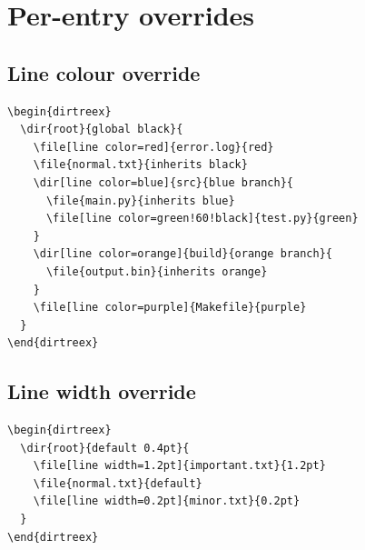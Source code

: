 \documentclass[11pt]{article}
\begin{document}
\begin{dirtreex}[
  line color=red!70!black, line width=1pt,
  box={true, border color=red!80!black,
       border width=2pt, background color=red!5,
       margin=6pt}]
\end{dirtreex}

\clearpage

\section{Per-entry overrides}

\subsection{Line colour override}

\begin{Verbatim}
\begin{dirtreex}
  \dir{root}{global black}{
    \file[line color=red]{error.log}{red}
    \file{normal.txt}{inherits black}
    \dir[line color=blue]{src}{blue branch}{
      \file{main.py}{inherits blue}
      \file[line color=green!60!black]{test.py}{green}
    }
    \dir[line color=orange]{build}{orange branch}{
      \file{output.bin}{inherits orange}
    }
    \file[line color=purple]{Makefile}{purple}
  }
\end{dirtreex}
\end{Verbatim}

\begin{dirtreex}
\end{dirtreex}

\subsection{Line width override}

\begin{Verbatim}
\begin{dirtreex}
  \dir{root}{default 0.4pt}{
    \file[line width=1.2pt]{important.txt}{1.2pt}
    \file{normal.txt}{default}
    \file[line width=0.2pt]{minor.txt}{0.2pt}
  }
\end{dirtreex}
\end{Verbatim}
\end{document}

